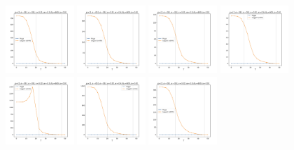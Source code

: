 \documentclass[a4paper]{article}
\begin{document}
\begin{figure}[H]
  \centering
  \includegraphics[width=0.23\textwidth]{grid-g5-v1-w1_0}
  \includegraphics[width=0.23\textwidth]{grid-g5-v1-w2_0}
  \includegraphics[width=0.23\textwidth]{grid-g5-v1-w3_0}
  \includegraphics[width=0.23\textwidth]{grid-g5-v1-w4_0}
  \\
  \includegraphics[width=0.23\textwidth]{grid-g5-v2-w1_0}
  \includegraphics[width=0.23\textwidth]{grid-g5-v2-w2_0}
  \includegraphics[width=0.23\textwidth]{grid-g5-v2-w3_0}

\end{figure}
\end{document}
